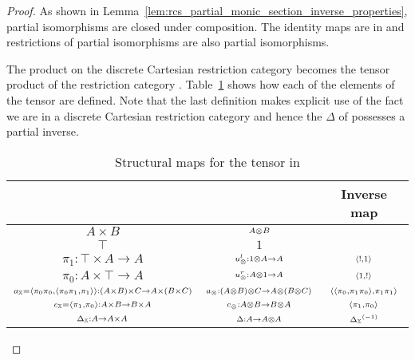 \begin{proof}
  As shown in Lemma~\ref{lem:rcs_partial_monic_section_inverse_properties}, partial isomorphisms
  are closed under composition. The identity maps are in \Inv{\X} and restrictions of
  partial isomorphisms are also partial isomorphisms.

  The product on the discrete Cartesian restriction category \X becomes the tensor product of the
  restriction category \Inv{\X}. Table~\ref{tab:structural_maps_for_the_tensor_in_invx} shows how
  each of the elements of the tensor are defined. Note that the last definition makes explicit use
  of the fact we are in a discrete Cartesian restriction category and hence the $\Delta$ of \X
  possesses a partial inverse.

  \begin{table}[!htbp]
    \begin{center}
      \begin{tabular}{|ccc|}
        \hline
        \X & \Inv{\X} & Inverse map\\
        \hline\hline
        $\scriptstyle A\times B$ & $\scriptstyle A\otimes B$ &\\[6pt]
        \hline
        $\scriptstyle \top$ & $\scriptstyle 1$ &\\[6pt]
        \hline
        $\scriptstyle \pi_1:\top\times A \to A$ & $\scriptstyle u_{\otimes}^l:1\otimes A \to A$ & $\scriptstyle \langle!,1\rangle$\\[6pt]
        \hline
        $\scriptstyle \pi_0:A\times\top \to A$ & $\scriptstyle u_{\otimes}^r:A\otimes1 \to A$& $\scriptstyle \langle1,!\rangle$\\[6pt]
        \hline
        ${\scriptstyle a_{\mathbb{X}} = \langle\pi_0 \pi_0,\langle\pi_0 \pi_1,\pi_1\rangle\rangle:(A\times B)\times C \to A\times(B\times C)}$
          & $\scriptstyle a_{\otimes}:(A\otimes B)\otimes C \to A\otimes(B\otimes C)$
          & $\scriptstyle \langle\langle\pi_0, \pi_1 \pi_0\rangle,\pi_1 \pi_1\rangle$\\[6pt]
        \hline
        $\scriptstyle c_{\mathbb{X}}=\langle \pi_1,\pi_0\rangle:A\times B \to B\times A$ & $\scriptstyle c_{\otimes}:A\otimes B \to B \otimes A$ & $\scriptstyle \langle \pi_1,\pi_0\rangle$\\[6pt]
        \hline
        $\scriptstyle \Delta_{\mathbb{X}}:A\to A\times A$ & $\scriptstyle \Delta:A \to A\otimes A$ & $\scriptstyle  {\Delta_{\ensuremath{\mathbb{X}}}}^{(-1)} $\\[6pt]
        \hline
      \end{tabular}

    \end{center}
    \caption{Structural maps for the tensor in \Inv{\X}}
    \label{tab:structural_maps_for_the_tensor_in_invx}
  \end{table}


\end{proof}
